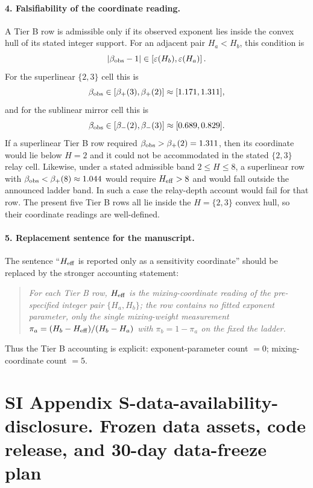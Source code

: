 \paragraph{4. Falsifiability of the coordinate reading.}
A Tier B row is admissible only if its observed exponent lies inside the convex hull of its stated integer support. For an adjacent pair \(H_a<H_b\), this condition is
\[
|\beta_{\rm obs}-1|\in
\left[\varepsilon(H_b),\varepsilon(H_a)\right].
\]
For the superlinear \(\{2,3\}\) cell this is
\[
\beta_{\rm obs}\in
[\beta_+(3),\beta_+(2)]
\approx
[1.171,1.311],
\]
and for the sublinear mirror cell this is
\[
\beta_{\rm obs}\in
[\beta_-(2),\beta_-(3)]
\approx
[0.689,0.829].
\]
If a superlinear Tier B row required \(\beta_{\rm obs}>\beta_+(2)=1.311\), then its coordinate would lie below \(H=2\) and it could not be accommodated in the stated \(\{2,3\}\) relay cell. Likewise, under a stated admissible band \(2\leq H\leq 8\), a superlinear row with \(\beta_{\rm obs}<\beta_+(8)\approx 1.044\) would require \(H_{\rm eff}>8\) and would fall outside the announced ladder band. In such a case the relay-depth account would fail for that row. The present five Tier B rows all lie inside the \(H=\{2,3\}\) convex hull, so their coordinate readings are well-defined.

\paragraph{5. Replacement sentence for the manuscript.}
The sentence ``\(H_{\rm eff}\) is reported only as a sensitivity coordinate'' should be replaced by the stronger accounting statement:
\begin{quote}
\itshape
For each Tier B row, \(H_{\rm eff}\) is the mixing-coordinate reading of the pre-specified integer pair \(\{H_a,H_b\}\); the row contains no fitted exponent parameter, only the single mixing-weight measurement \(\pi_a=(H_b-H_{\rm eff})/(H_b-H_a)\) with \(\pi_b=1-\pi_a\) on the fixed the ladder.
\end{quote}
Thus the Tier B accounting is explicit: exponent-parameter count \(=0\); mixing-coordinate count \(=5\).



\clearpage
\section*{SI Appendix S-data-availability-disclosure. Frozen data assets, code release, and 30-day data-freeze plan}\label{sec:S-data-availability-disclosure}
\sloppy

